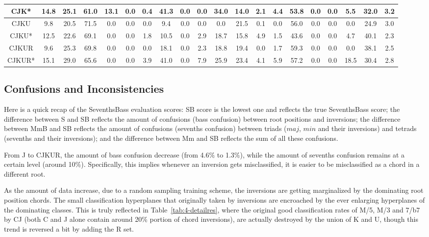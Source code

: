 \begin{landscape}
\begin{table*}[h]
\begin{tabular}{|c|c|c|c|c|c|c|c|c|c|c|c|c|c|c|c|c|c|c|c|}
CJK* & 14.8 & 25.1 & 61.0 & 13.1 & 0.0 & 0.4 & 41.3 & 0.0 & 0.0 & 34.0 & 14.0 & 2.1 & 4.4 & 53.8 & 0.0 & 0.0 & 5.5 & 32.0 & 3.2\\ \hline
CJKU & 9.8 & 20.5 & 71.5 & 0.0 & 0.0 & 0.0 & 9.4 & 0.0 & 0.0 & 0.0 & 21.5 & 0.1 & 0.0 & 56.0 & 0.0 & 0.0 & 0.0 & 24.9 & 3.0\\ \hline
CJKU* & 12.5 & 22.6 & 69.1 & 0.0 & 0.0 & 1.8 & 10.5 & 0.0 & 2.9 & 18.7 & 15.8 & 4.9 & 1.5 & 43.6 & 0.0 & 0.0 & 4.7 & 40.1 & 2.3\\ \hline
CJKUR & 9.6 & 25.3 & 69.8 & 0.0 & 0.0 & 0.0 & 18.1 & 0.0 & 2.3 & 18.8 & 19.4 & 0.0 & 1.7 & 59.3 & 0.0 & 0.0 & 0.0 & 38.1 & 2.5 \\ \hline
CJKUR* & 15.1 & 29.0 & 65.6 & 0.0 & 0.0 & 3.9 & 41.0 & 0.0 & 7.9 & 25.9 & 23.4 & 4.1 & 5.9 & 57.2 & 0.0 & 0.0 & 18.5 & 30.4 & 2.8\\ \hline
\end{tabular}
\end{table*}
\end{landscape}

\subsection{Confusions and Inconsistencies}
Here is a quick recap of the SeventhsBass evaluation scores: SB score is the lowest one and reflects the true SeventhsBass score; the difference between S and SB reflects the amount of confusions (bass confusion) between root positions and inversions; the difference between MmB and SB reflects the amount of confusions (sevenths confusion) between triads ($maj$, $min$ and their inversions) and tetrads (sevenths and their inversions); and the difference between Mm and SB reflects the sum of all these confusions.

From J to CJKUR, the amount of bass confusion decrease (from 4.6\% to 1.3\%), while the amount of sevenths confusion remains at a certain level (around 10\%). Specifically, this implies whenever an inversion gets misclassified, it is easier to be misclassified as a chord in a different root.

As the amount of data increase, due to a random sampling training scheme, the inversions are getting marginalized by the dominating root position chords. The small classification hyperplanes that originally taken by inversions are encroached by the ever enlarging hyperplanes of the dominating classes. This is truly reflected in Table~\ref{tab:4-detailres}, where the original good classification rates of M/5, M/3 and 7/b7 by CJ (both C and J alone contain around 20\% portion of chord inversions), are actually destroyed by the union of K and U, though this trend is reversed a bit by adding the R set.

